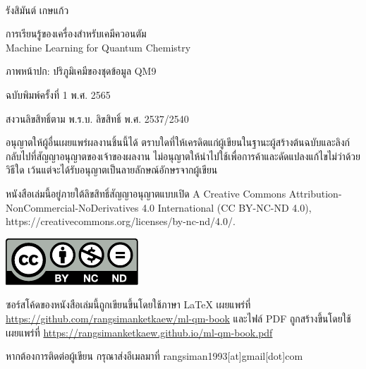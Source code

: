 

{
~\vfill
\thispagestyle{empty}
\setlength{\parindent}{0em}

รังสิมันต์ เกษแก้ว

การเรียนรู้ของเครื่องสำหรับเคมีควอนตัม\\
Machine Learning for Quantum Chemistry

ภาพหน้าปก: ปริภูมิเคมีของชุดข้อมูล QM9

\bigskip

\par{ฉบับพิมพ์ครั้งที่ 1 พ.ศ. 2565}

สงวนลิขสิทธิ์ตาม พ.ร.บ. ลิขสิทธิ์ พ.ศ. 2537/2540

อนุญาตให้ผู้อื่นเผยแพร่ผลงานชิ้นนี้ได้ ตราบใดที่ให้เครดิตแก่ผู้เขียนในฐานะผู้สร้างต้นฉบับและลิงก์กลับไปที่สัญญาอนุญาตของเจ้าของผลงาน 
ไม่อนุญาตให้นำไปใช้เพื่อการค้าและดัดแปลงแก้ไขไม่ว่าด้วยวิธีใด เว้นแต่จะได้รับอนุญาตเป็นลายลักษณ์อักษรจากผู้เขียน

หนังสือเล่มนี้อยู่ภายใต้ลิขสิทธิ์สัญญาอนุญาตแบบเปิด A Creative Commons Attribution-NonCommercial-NoDerivatives 4.0 
International (CC BY-NC-ND 4.0), https://creativecommons.org/licenses/by-nc-nd/4.0/.

\includegraphics[scale=1.2]{front_matter/by-nc-nd.pdf}

\bigskip

ซอร์สโค้ดของหนังสือเล่มนี้ถูกเขียนขึ้นโดยใช้ภาษา {\selectfont \LaTeX} เผยแพร่ที่ 
\url{https://github.com/rangsimanketkaew/ml-qm-book} และไฟล์ PDF ถูกสร้างขึ้นโดยใช้ {\selectfont 
\XeLaTeX} เผยแพร่ที่ \url{https://rangsimanketkaew.github.io/ml-qm-book.pdf}

หากต้องการติดต่อผู้เขียน กรุณาส่งอีเมลมาที่ rangsiman1993[at]gmail[dot]com
}
